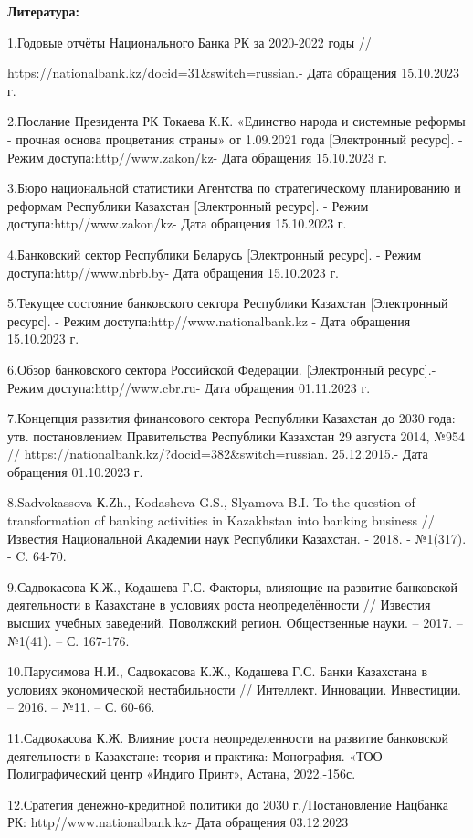 \begin{center}
{\bfseries Литература:}
\end{center}

\begin{noparindent}
1.Годовые отчёты Национального Банка РК за 2020-2022 годы //

https://nationalbank.kz/docid=31\&switch=russian.- Дата обращения
15.10.2023 г.

2.Послание Президента РК Токаева К.К. «Единство народа и системные
реформы - прочная основа процветания страны» от 1.09.2021 года
{[}Электронный ресурс{]}. - Режим доступа:http//www.zakon/kz- Дата
обращения 15.10.2023 г.

3.Бюро национальной статистики Агентства по стратегическому планированию
и реформам Республики Казахстан {[}Электронный ресурс{]}. - Режим
доступа:http//www.zakon/kz- Дата обращения 15.10.2023 г.

4.Банковский сектор Республики Беларусь {[}Электронный ресурс{]}. -
Режим доступа:http//www.nbrb.by- Дата обращения 15.10.2023 г.

5.Текущее состояние банковского сектора Республики Казахстан
{[}Электронный ресурс{]}. - Режим доступа:http//www.nationalbank.kz -
Дата обращения 15.10.2023 г.

6.Обзор банковского сектора Российской Федерации. {[}Электронный
ресурс{]}.- Режим доступа:http//www.cbr.ru- Дата обращения 01.11.2023 г.

7.Концепция развития финансового сектора Республики Казахстан до 2030
года: утв. постановлением Правительства Республики Казахстан 29 августа
2014, №954 // https://nationalbank.kz/?docid=382\&switch=russian.
25.12.2015.- Дата обращения 01.10.2023 г.

8.Sadvokassova К.Zh., Kodasheva G.S., Slyamova B.I. To the question of
transformation of banking activities in Kazakhstan into banking business
// Известия Национальной Академии наук Республики Казахстан. - 2018. -
№1(317). - C. 64-70.

9.Садвокасова К.Ж., Кодашева Г.С. Факторы, влияющие на развитие
банковской деятельности в Казахстане в условиях роста неопределённости
// Известия высших учебных заведений. Поволжский регион. Общественные
науки. -- 2017. -- №1(41). -- С. 167-176.

10.Парусимова Н.И., Садвокасова К.Ж., Кодашева Г.С. Банки Казахстана в
условиях экономической нестабильности // Интеллект. Инновации.
Инвестиции. -- 2016. -- №11. -- С. 60-66.

11.Садвокасова К.Ж. Влияние роста неопределенности на развитие
банковской деятельности в Казахстане: теория и практика:
Монография.-«ТОО Полиграфический центр «Индиго Принт», Астана,
2022.-156с.

12.Сратегия денежно-кредитной политики до 2030 г./Постановление Нацбанка
РК: http//www.nationalbank.kz- Дата обращения 03.12.2023
\end{noparindent}

